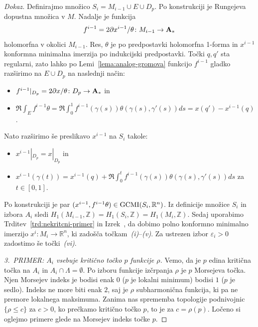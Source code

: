 \documentclass[12pt,a4paper,twoside]{article}
\theoremstyle{definition} %
\newenvironment{dokaz}[1][Dokaz]{\begin{proof}[#1]}{\end{proof}}
\theoremstyle{plain} %
\numberwithin{equation}{section}  %
\begin{document}
\begin{dokaz}
Definirajmo množico $S_{i} = M_{i-1} \cup E \cup D_{p}$. Po konstrukciji je Rungejeva dopustna množica v $M$. 
Nadalje je funkcija 
\begin{gather*}
f^{i-1} = 2 \partial x^{i-1} / \theta \colon M_{i-1} \to \textup{\textbf{A}}_{*}
\end{gather*} 
holomorfna v okolici $M_{i-1}$. Res, $\theta$ je po predpostavki holomorfna 1-forma in $x^{i-1}$ konformna minimalna imerzija po indukcijski predpostavki. 
Točki $q, q'$ sta regularni, zato lahko po Lemi~\ref{lema:analog-gromova} funkcijo $f^{i-1}$ gladko razširimo na $E \cup D_{p}$ na naslednji način:
\begin{itemize}
\item $ f^{i-1}|_{D_{p}} = 2 \partial x / \theta \colon D_{p} \to \textup{\textbf{A}}_{*} $ in
\item $ \Re \int_{E} f^{i-1} \theta = \Re \int_{0}^{1} f^{i-1}(\gamma(s)) \theta(\gamma(s), \gamma '(s)) ds = x(q') - x^{i-1}(q) $.
\end{itemize}
%
Nato razširimo še preslikavo $x^{i-1}$ na $S_{i}$ takole:
\begin{itemize}
\item $ x^{i-1}|_{D_{p}} = x|_{D_{p}} $ in
\item $ x^{i-1}(\gamma(t)) = x^{i-1}(q) + \Re \int_{0}^{t} f^{i-1}(\gamma(s)) \theta(\gamma(s), \gamma '(s)) ds$ za $t \in [0,1]$.
\end{itemize}
%
Po konstrukciji je par $(x^{i-1}, f^{i-1} \theta) \in \textup{GCMI}(S_{i}, \mathbb{R}^{n})$. Iz definicije množice $S_{i}$ in izbora $A_{i}$ sledi $H_{1}(M_{i-1}, \mathbb{Z}) = H_{1}(S_{i}, \mathbb{Z}) = H_{1}(M_{i}, \mathbb{Z})$. 
Sedaj uporabimo Trditev~\ref{trd:nekritcni-primer} in Izrek~\cite[Theorem~3.4.1]{alarcon2021minimal},
da dobimo polno konformno minimalno imerzijo $x^{i} \colon M_{i} \to \mathbb{R}^{n}$, ki zadošča točkam~\textit{(i)}--\textit{(v)}. Za ustrezen izbor $\varepsilon_{i} > 0$ zadostimo še točki~\textit{(vi)}. \newline

\textit{3.~PRIMER: $A_{i}$ vsebuje kritično točko $p$ funkcije $\rho$.} \newline
Vemo, da je $p$ edina kritična točka na $A_{i}$ in $A_{i} \cap \Lambda = \emptyset$. Po izboru funkcije izčrpanja $\rho$ je $p$ Morsejeva točka.
Njen Morsejev indeks je bodisi enak $0$ ($p$ je lokalni minimum) bodisi $1$ ($p$ je sedlo). Indeks ne more biti enak $2$, saj je $\rho$ subharmonična funkcija, ki pa ne premore lokalnega maksimuma.
Zanima nas sprememba topologije podnivojnic $\{ \rho \leq c \}$ za $c>0$, ko prečkamo kritično točko $p$, to je za $c = \rho(p)$. Ločeno si oglejmo primere glede na Morsejev indeks točke $p$. \newline


\end{dokaz}
\end{document}
